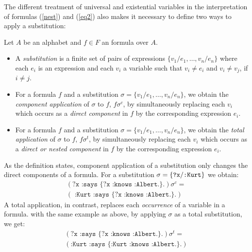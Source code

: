 The different treatment of universal and existential variables in the interpretation of formulas (\ref{nest}) and (\ref{eq2}) also makes it necessary to define two ways to apply a substitution: 




\begin{definition}[Substitution]

Let $A$ be an \nthree alphabet %
and $f\in F$ an \nthree formula over $A$. 
\begin{itemize}
 \item A \emph{substitution} is a finite set of pairs of expressions $\{v_1/e_1, \ldots, v_n/e_n\}$ where each $e_i$ is an expression and each $v_i$ 
 a variable such that $v_i\neq e_i$ and 
 $v_i \neq v_j$,
 if $i\neq j$. 
 \item %
 For a formula $f$ and a substitution $\sigma=\{v_1/e_1, \ldots, v_n/e_n\}$, we obtain the \emph{component application} of $\sigma$ to $f$, $f\sigma^c$, by simultaneously replacing each $v_i$ 
 which occurs as a \emph{direct component} in $f$ by the corresponding expression $e_i$. 
 \item %
 For a formula $f$ and a substitution $\sigma=\{v_1/e_1, \ldots, v_n/e_n\}$, we obtain the \emph{total application} of $\sigma$ to $f$, $f\sigma^t$, by simultaneously replacing each $v_i$ 
 which occurs as a \emph{direct or nested component} in $f$ by the corresponding expression $e_i$. 
 \end{itemize}
\end{definition}

As the definition states, component application of a substitution only changes the direct components of a formula. For a substitution $\sigma=\{\verb!?x!/ \verb!:Kurt!\}$ we obtain:
\begin{multline}
(\texttt{?x :says \{?x :knows :Albert.\}.})\sigma^c  =\nonumber \\ (\texttt{ :Kurt :says \{?x :knows :Albert.\}.})\nonumber
\end{multline}
A total application, in contrast, replaces each \emph{occurrence} of a variable in a formula. with the same example as above, by applying $\sigma$ as a total substitution, we get:
\begin{multline}
(\texttt{?x :says \{?x :knows :Albert.\}.})\sigma^t =\\ (\texttt{:Kurt :says \{:Kurt :knows :Albert.\}.})\nonumber
\end{multline}


